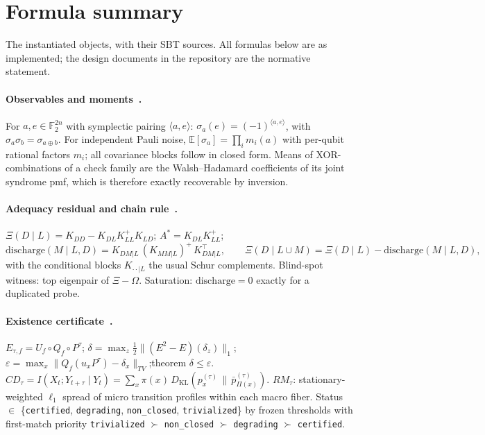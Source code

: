 \documentclass[11pt]{article}
\newcommand{\Xires}{\Xi(D \mid L)}
\theoremstyle{definition}
\begin{document}
 \section{Formula summary}
\label{app:formulas}

The instantiated objects, with their SBT sources. All formulas below are as implemented; the design documents in the repository are the normative statement.

\paragraph{Observables and moments~\cite{sbt-xi,sbt-f3}.} For $a, e \in \mathbb{F}_2^{2n}$ with symplectic pairing $\langle a, e\rangle$: $\sigma_a(e) = (-1)^{\langle a,e\rangle}$, with $\sigma_a \sigma_b = \sigma_{a \oplus b}$. For independent Pauli noise, $\mathbb{E}[\sigma_a] = \prod_i m_i(a)$ with per-qubit rational factors $m_i$; all covariance blocks follow in closed form. Means of XOR-combinations of a check family are the Walsh--Hadamard coefficients of its joint syndrome pmf, which is therefore exactly recoverable by inversion.

\paragraph{Adequacy residual and chain rule~\cite{sbt-xi}.}
$\Xires = K_{DD} - K_{DL}K_{LL}^{+}K_{LD}$; \quad $A^{*} = K_{DL}K_{LL}^{+}$;
\[
\mathrm{discharge}(M \mid L, D) = K_{DM|L}\,(K_{MM|L})^{+}\,K_{DM|L}^{\top}, \qquad
\Xi(D \mid L \cup M) = \Xires - \mathrm{discharge}(M \mid L, D),
\]
with the conditional blocks $K_{\cdot\cdot|L}$ the usual Schur complements. Blind-spot witness: top eigenpair of $\Xi - \Omega$. Saturation: $\mathrm{discharge} = 0$ exactly for a duplicated probe.

\paragraph{Existence certificate~\cite{sbt-f1,sbt-f3,sbt-xor,sbt-ng,sbt-cast}.}
$E_{\tau,f} = U_f \circ Q_f \circ P^\tau$;\quad
$\delta = \max_z \tfrac12 \|(E^2 - E)(\delta_z)\|_1$;\quad
$\varepsilon = \max_x \|Q_f(u_x P^{\tau}) - \delta_x\|_{TV}$;\quad theorem $\delta \le \varepsilon$.
$CD_\tau = I(X_t; Y_{t+\tau} \mid Y_t) = \sum_x \pi(x)\, D_{\mathrm{KL}}(p_x^{(\tau)} \,\|\, \bar p_{\Pi(x)}^{(\tau)})$.
$RM_\tau$: stationary-weighted $\ell_1$ spread of micro transition profiles within each macro fiber. Status $\in$ \{\texttt{certified}, \texttt{degrading}, \texttt{non\_closed}, \texttt{trivialized}\} by frozen thresholds with first-match priority \texttt{trivialized} $\succ$ \texttt{non\_closed} $\succ$ \texttt{degrading} $\succ$ \texttt{certified}.
\end{document}
